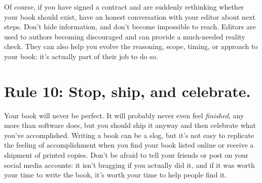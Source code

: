 \documentclass[10pt,letterpaper]{article}
\begin{document}
Of course, if you have signed a contract and are suddenly rethinking
whether your book should exist, have an honest conversation with your
editor about next steps.  Don't hide information, and don't become
impossible to reach.  Editors are used to authors becoming discouraged
and can provide a much-needed reality check.  They can also help you
evolve the reasoning, scope, timing, or approach to your book: it's
actually part of their job to do so.

\section*{Rule 10: Stop, ship, and celebrate.}

Your book will never be perfect.  It will probably never even feel
\emph{finished}, any more than software does, but you should ship it
anyway and then celebrate what you've accomplished.  Writing a book
can be a slog, but it's not easy to replicate the feeling of
accomplishment when you find your book listed online or receive a
shipment of printed copies.  Don't be afraid to tell your friends or
post on your social media accounts: it isn't bragging if you actually
did it, and if it was worth your time to write the book, it's worth
your time to help people find it.



\end{document}
